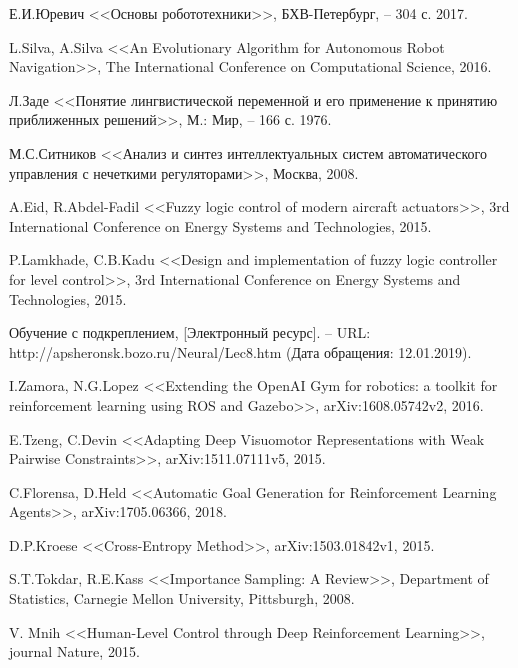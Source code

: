 \begingroup 
\renewcommand{\section}[2]{\anonsection{Список использованных источников}}
\begin{thebibliography}{99}

	Е.И.Юревич  
    <<Основы робототехники>>,
    БХВ-Петербург,  
    -- 304 с. 2017.

	L.Silva, A.Silva
	<<An Evolutionary Algorithm for Autonomous Robot Navigation>>,
	The International Conference on Computational Science,
	2016.

	Л.Заде 
	<<Понятие лингвистической переменной и его применение к принятию приближенных решений>>,
	М.: Мир,  
	-- 166 с. 1976.

	М.С.Ситников
	<<Анализ и синтез интеллектуальных систем автоматического управления с нечеткими регуляторами>>,
	Москва,
	2008.

	A.Eid, R.Abdel-Fadil
	<<Fuzzy logic control of modern aircraft actuators>>,
	3rd International Conference on Energy Systems and Technologies,
	2015.

	P.Lamkhade, C.B.Kadu
	<<Design and implementation of fuzzy logic controller for level control>>,
	3rd International Conference on Energy Systems and Technologies,
	2015.

	Обучение с подкреплением,
	[Электронный ресурс]. --
	URL: http://apsheronsk.bozo.ru/Neural/Lec8.htm
	(Дата обращения: 12.01.2019).

	I.Zamora, N.G.Lopez
	<<Extending the OpenAI Gym for robotics: a toolkit for reinforcement learning using ROS and Gazebo>>,
	arXiv:1608.05742v2,
	2016.

	E.Tzeng, C.Devin
	<<Adapting Deep Visuomotor Representations with Weak Pairwise Constraints>>,
	arXiv:1511.07111v5,
	2015.

	C.Florensa, D.Held
	<<Automatic Goal Generation for Reinforcement Learning Agents>>,
	arXiv:1705.06366,
	2018.

	D.P.Kroese
	<<Cross-Entropy Method>>,
	arXiv:1503.01842v1,
	2015.

	S.T.Tokdar, R.E.Kass
	<<Importance Sampling: A Review>>,
	Department of Statistics, Carnegie Mellon University, Pittsburgh, 
	2008.
	
	V. Mnih
	<<Human-Level Control through Deep Reinforcement Learning>>,
	journal Nature, 
	2015.


\end{thebibliography}
